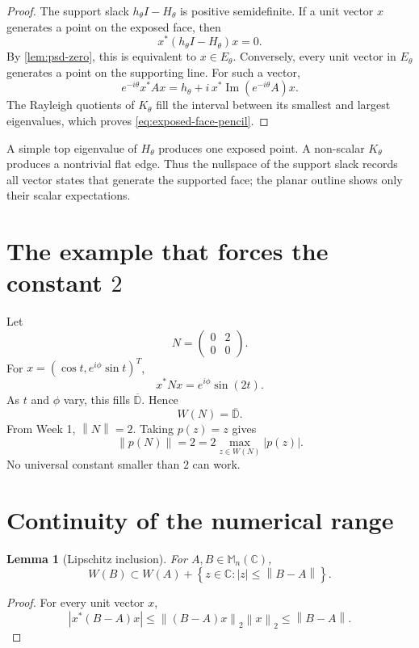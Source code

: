 \documentclass[11pt,oneside,openany]{book}
\newtheorem{lemma}[theorem]{Lemma}
\theoremstyle{definition}
\theoremstyle{remark}
\newcommand{\C}{\mathbb C}
\newcommand{\D}{\mathbb D}
\newcommand{\Mn}{\mathbb M_n(\C)}
\newcommand{\ImPart}{\operatorname{Im}}
\newcommand{\norm}[1]{\left\lVert #1\right\rVert}
\newcommand{\set}[1]{\left\{#1\right\}}
\newcommand{\olD}{\overline{\D}}
\begin{document}
\begin{proof}
The support slack \(h_\theta I-H_\theta\) is positive semidefinite.  If
a unit vector \(x\) generates a point on the exposed face, then
\[
  x^*(h_\theta I-H_\theta)x=0.
\]
By \cref{lem:psd-zero}, this is equivalent to \(x\in E_\theta\).
Conversely, every unit vector in \(E_\theta\) generates a point on the
supporting line.  For such a vector,
\[
  e^{-i\theta}x^*Ax
  =
  h_\theta+
  i\,x^*\ImPart(e^{-i\theta}A)x.
\]
The Rayleigh quotients of \(K_\theta\) fill the interval between its
smallest and largest eigenvalues, which proves
\eqref{eq:exposed-face-pencil}.
\end{proof}

\begin{intuitionbox}
A simple top eigenvalue of \(H_\theta\) produces one exposed point.
A non-scalar \(K_\theta\) produces a nontrivial flat edge.  Thus the
nullspace of the support slack records all vector states that generate
the supported face; the planar outline shows only their scalar
expectations.
\end{intuitionbox}

\section{The example that forces the constant
\texorpdfstring{\(2\)}{2}}

Let
\[
  N=\begin{pmatrix}0&2\\0&0\end{pmatrix}.
\]
For
\(
x=(\cos t,e^{i\phi}\sin t)^T
\),
\[
  x^*Nx=e^{i\phi}\sin(2t).
\]
As \(t\) and \(\phi\) vary, this fills \(\olD\).  Hence
\[
  W(N)=\olD.
\]
From Week 1, \(\norm{N}=2\).  Taking \(p(z)=z\) gives
\[
  \norm{p(N)}=2
  =2\max_{z\in W(N)}|p(z)|.
\]
No universal constant smaller than \(2\) can work.

\section{Continuity of the numerical range}

\begin{lemma}[Lipschitz inclusion]
\label{lem:W-Lipschitz}
For \(A,B\in\Mn\),
\[
  W(B)\subset W(A)+\set{z\in\C:|z|\leq\norm{B-A}}.
\]
\end{lemma}

\begin{proof}
For every unit vector \(x\),
\[
  |x^*(B-A)x|
  \leq\norm{(B-A)x}_2\norm{x}_2
  \leq\norm{B-A}.
\]
\end{proof}
\end{document}
